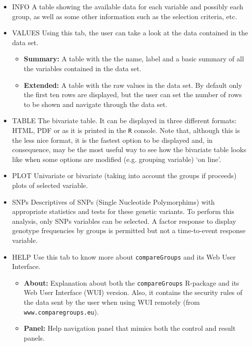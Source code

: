 \documentclass[11pt]{article}
\begin{document}
\begin{itemize}

\item \color{blue} INFO \color{black}
  A table showing the available data for each variable and possibly each group, as well as some other information such as the selection criteria, etc.

\item \color{blue} VALUES \color{black}
  Using this tab, the user can take a look at the data contained in the data set.

  \begin{itemize}
  \item \textbf{Summary:} A table with the the name, label and a basic summary of all the variables contained in the data set.
  \item \textbf{Extended:} A table with the raw values in the data set. By default only the first ten rows are displayed, but the user can set the number of rows to be shown and navigate through the data set.
  \end{itemize}

\item \color{blue} TABLE \color{black} 
  The bivariate table. It can be displayed in three different formats: HTML, PDF or as
it is printed in the {\tt R} console. Note that, although this is the less nice format, it is the fastest option to be displayed and, in consequence, may be the most useful way to see how the bivariate table looks like when some options are modified (e.g. grouping variable) `on line'.

\item \color{blue} PLOT \color{black} 
  Univariate or bivariate (taking into account the groups if proceeds) plots of selected
variable.

\item \color{blue} SNPs \color{black} 
  Descriptives of SNPs (Single Nucleotide Polymorphims) with appropriate statistics and
tests for these genetic variants. To perform this analysis, only SNPs variables can be selected. A factor response to display genotype frequencies by groups is permitted but not a time-to-event response variable.

\item \color{blue} HELP \color{black} 
  Use this tab to know more about {\tt compareGroups} and its Web User Interface.
  \begin{itemize}
  \item \textbf{About:} Explanation about both the {\tt compareGroups} R-package and its Web User Interface (WUI) version. Also, it contains the security rules of the data sent by the user when using WUI remotely (from {\tt www.comparegroups.eu}). 
  \item \textbf{Panel:} Help navigation panel that mimics both the control and result panels.
  \end{itemize}

\end{itemize}
\end{document}
